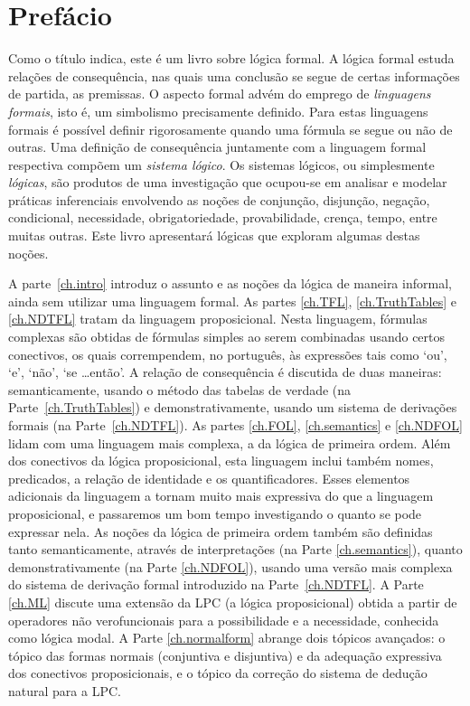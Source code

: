 \chapter{Prefácio}

Como o título indica, este é um livro sobre lógica formal.
A lógica formal estuda relações de consequência, nas quais uma conclusão se segue de certas informações de partida, as premissas.
O aspecto formal advém do emprego de \emph{linguagens formais}, isto é, um simbolismo precisamente definido.
Para estas linguagens formais é possível definir rigorosamente quando uma fórmula se segue ou não de outras.
Uma definição de consequência juntamente com a linguagem formal respectiva compõem um \emph{sistema lógico}.
Os sistemas lógicos, ou simplesmente \emph{lógicas}, são produtos de uma investigação que ocupou-se em analisar e modelar práticas inferenciais envolvendo as noções de conjunção, disjunção, negação, condicional, necessidade, obrigatoriedade, provabilidade, crença, tempo, entre muitas outras.
Este livro apresentará lógicas que exploram algumas destas noções.


A parte~\ref{ch.intro} introduz o assunto e as noções da lógica de maneira informal, ainda sem utilizar uma linguagem formal.
As partes \ref{ch.TFL}, \ref{ch.TruthTables} e \ref{ch.NDTFL} tratam da linguagem proposicional.  Nesta linguagem, fórmulas complexas são obtidas de fórmulas simples ao serem combinadas usando certos conectivos, os quais corrempendem, no português, às expressões tais como `ou', `e', `não', `se \dots então'.
A relação de consequência é discutida de duas maneiras:
semanticamente, usando o método das tabelas de verdade (na Parte~\ref{ch.TruthTables}) e demonstrativamente, usando um sistema de derivações formais (na Parte~\ref{ch.NDTFL}).
As partes \ref{ch.FOL}, \ref{ch.semantics} e \ref{ch.NDFOL} lidam com uma linguagem mais complexa, a da lógica de primeira ordem.
Além dos conectivos da lógica proposicional, esta linguagem inclui também nomes, predicados, a relação de identidade e os quantificadores.
Esses elementos adicionais da linguagem a tornam muito mais expressiva do que a linguagem proposicional, e passaremos um bom tempo investigando o quanto se pode expressar nela.
As noções da lógica de primeira ordem também são definidas tanto semanticamente, através de interpretações (na Parte \ref{ch.semantics}), quanto demonstrativamente (na Parte \ref{ch.NDFOL}), usando uma versão mais complexa do sistema de derivação formal introduzido na Parte~\ref{ch.NDTFL}.
A Parte \ref{ch.ML} discute uma extensão da LPC (a lógica proposicional) obtida a partir de operadores não verofuncionais para a possibilidade e a necessidade, conhecida como lógica modal.
A Parte \ref{ch.normalform} abrange dois tópicos avançados:
o tópico das formas normais (conjuntiva e disjuntiva) e da adequação expressiva dos conectivos proposicionais, e o tópico da correção do sistema de dedução natural para a LPC.

